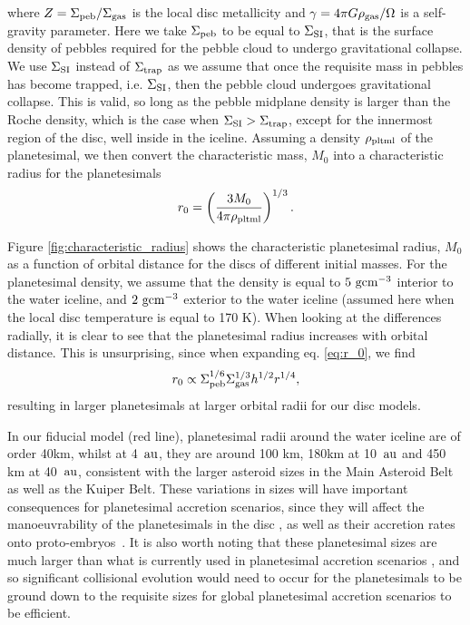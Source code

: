\documentclass[a4paper,fleqn,usenatbib]{mnras}
\newcommand{\au}{{\, {\rm au}}}
\newcommand{\embs}{{{proto-embryos~}}}
\begin{document}
where $Z=\Sigma_{\rm peb}/\Sigma_{\rm gas}$ is the local disc metallicity and $\gamma=4\pi G\rho_{\rm gas}/\Omega$ is a self-gravity parameter.
Here we take $\Sigma_{\rm peb}$ to be equal to $\Sigma_{\rm SI}$, that is the surface density of pebbles required for the pebble cloud to undergo gravitational collapse.
We use $\Sigma_{\rm SI}$ instead of $\Sigma_{\rm trap}$ as we assume that once the requisite mass in pebbles has become trapped, i.e. $\Sigma_{\rm SI}$, then the pebble cloud undergoes gravitational collapse.
This is valid, so long as the pebble midplane density is larger than the Roche density, which is the case when $\Sigma_{\rm SI}>\Sigma_{\rm trap}$, except for the innermost region of the disc, well inside in the iceline.
Assuming a density $\rho_{\rm pltml}$ of the planetesimal, we then convert the characteristic mass, $M_0$ into a characteristic radius for the planetesimals
\begin{equation}
\label{eq:r_0}
    r_{\rm 0} = \left(\frac{3M_0}{4\pi\rho_{\rm pltml}}\right)^{1/3}.
\end{equation}

Figure \ref{fig:characteristic_radius} shows the characteristic planetesimal radius, $M_0$ as a function of orbital distance for the discs of different initial masses.
For the planetesimal density, we assume that the density is equal to $5~\rm gcm^{-3}$ interior to the water iceline, and $2~\rm gcm^{-3}$ exterior to the water iceline (assumed here when the local disc temperature is equal to 170 K).
When looking at the differences radially, it is clear to see that the planetesimal radius increases with orbital distance.
This is unsurprising, since when expanding eq. \ref{eq:r_0}, we find
\begin{equation}
\label{eq:r_0_propto}
r_0 \propto \Sigma_{\rm peb}^{1/6} \Sigma_{\rm gas}^{1/3} h^{1/2} r^{1/4},
\end{equation}
resulting in larger planetesimals at larger orbital radii for our disc models.

In our fiducial model (red line), planetesimal radii around the water iceline are of order 40km, whilst at 4 $\au$, they are around 100 km, 180km at 10 $\au$ and 450 km at 40 $\au$, consistent with the larger asteroid sizes in the Main Asteroid Belt as well as the Kuiper Belt.
These variations in sizes will have important consequences for planetesimal accretion scenarios, since they will affect the manoeuvrability of the planetesimals in the disc \citep{Adachi,Weidenschilling_77}, as well as their accretion rates onto \embs \citep{Inaba}.
It is also worth noting that these planetesimal sizes are much larger than what is currently used in planetesimal accretion scenarios \citep[e.g.][]{Mords09,ColemanNelson14,Mordasini15,ColemanNelson16,ColemanNelson16b}, and so significant collisional evolution would need to occur for the planetesimals to be ground down to the requisite sizes for global planetesimal accretion scenarios to be efficient.
\end{document}
